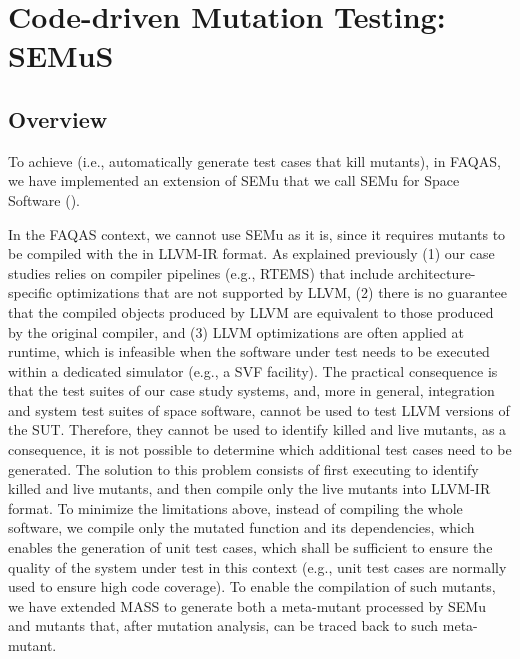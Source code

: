 
\newpage

\section{Code-driven Mutation Testing: SEMuS}

\subsection{Overview}
\label{sec:semus}





To achieve  (i.e., automatically generate test cases that kill mutants), in FAQAS, we have implemented an extension of SEMu that we call SEMu for Space Software ().



In the FAQAS context, we cannot use SEMu as it is, since it requires mutants to be compiled with the  in LLVM-IR format. As explained previously (1) our case studies relies on compiler pipelines (e.g., RTEMS) that include architecture-specific optimizations that are not supported by LLVM, (2) there is no guarantee that the compiled objects produced by LLVM are equivalent to those produced by the original compiler, and (3) LLVM optimizations are often applied at runtime, which is infeasible when the software under test needs to be executed within a dedicated simulator (e.g., a SVF facility). The practical consequence is that the test suites of our case study systems, and, more in general, integration and system test suites of space software, cannot be used to test LLVM versions of the SUT. 
Therefore, they cannot be used to identify killed and live mutants, as a consequence, it is not possible to determine which additional test cases need to be generated. 
The solution to this problem consists of first executing  to identify killed and live mutants, and then compile only the live mutants into LLVM-IR format. 
To minimize the limitations above, instead of compiling the whole software, we compile only the mutated function and its dependencies, which enables the generation of unit test cases, which shall be sufficient to ensure the quality of the system under test in this context (e.g., unit test cases are normally used to ensure high code coverage). To enable the compilation of such mutants, we have extended MASS to generate both a meta-mutant processed by SEMu and mutants that, after mutation analysis, can be traced back to such meta-mutant.

